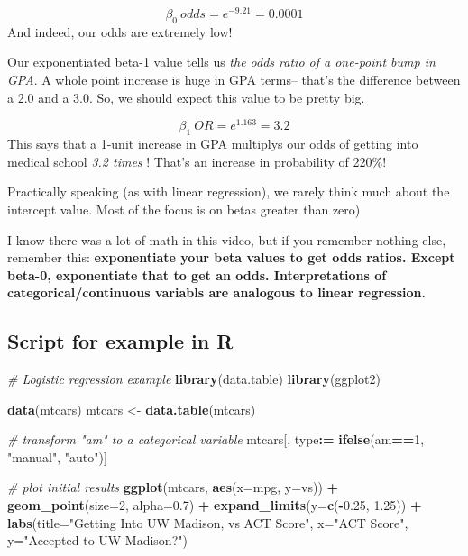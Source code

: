 \documentclass[]{article}
\newenvironment{Shaded}{\begin{snugshade}}{\end{snugshade}}
\newcommand{\KeywordTok}[1]{\textcolor[rgb]{0.13,0.29,0.53}{\textbf{#1}}}
\newcommand{\DataTypeTok}[1]{\textcolor[rgb]{0.13,0.29,0.53}{#1}}
\newcommand{\DecValTok}[1]{\textcolor[rgb]{0.00,0.00,0.81}{#1}}
\newcommand{\FloatTok}[1]{\textcolor[rgb]{0.00,0.00,0.81}{#1}}
\newcommand{\StringTok}[1]{\textcolor[rgb]{0.31,0.60,0.02}{#1}}
\newcommand{\CommentTok}[1]{\textcolor[rgb]{0.56,0.35,0.01}{\textit{#1}}}
\newcommand{\OperatorTok}[1]{\textcolor[rgb]{0.81,0.36,0.00}{\textbf{#1}}}
\newcommand{\ErrorTok}[1]{\textcolor[rgb]{0.64,0.00,0.00}{\textbf{#1}}}
\newcommand{\NormalTok}[1]{#1}
\begin{document}
\[ \beta_0 \ odds = e^{-9.21} = 0.0001 \] And indeed, our odds are
extremely low!

Our exponentiated beta-1 value tells us \emph{the odds ratio of a
one-point bump in GPA}. A whole point increase is huge in GPA terms--
that's the difference between a 2.0 and a 3.0. So, we should expect this
value to be pretty big.

\[ \beta_1 \ OR = e^{1.163} = 3.2 \] This says that a 1-unit increase in
GPA multiplys our odds of getting into medical school \emph{3.2 times} !
That's an increase in probability of 220\%!

Practically speaking (as with linear regression), we rarely think much
about the intercept value. Most of the focus is on betas greater than
zero)

I know there was a lot of math in this video, but if you remember
nothing else, remember this: \textbf{exponentiate your beta values to
get odds ratios. Except beta-0, exponentiate that to get an odds.
Interpretations of categorical/continuous variabls are analogous to
linear regression. }

\subsection{Script for example in R}\label{script-for-example-in-r}

\begin{Shaded}
\begin{Highlighting}[]
\CommentTok{# Logistic regression example}
\KeywordTok{library}\NormalTok{(data.table)}
\KeywordTok{library}\NormalTok{(ggplot2)}

\KeywordTok{data}\NormalTok{(mtcars)}
\NormalTok{mtcars <-}\StringTok{ }\KeywordTok{data.table}\NormalTok{(mtcars)}

\CommentTok{# transform "am" to a categorical variable}
\NormalTok{mtcars[, type}\OperatorTok{:}\ErrorTok{=}\StringTok{ }\KeywordTok{ifelse}\NormalTok{(am}\OperatorTok{==}\DecValTok{1}\NormalTok{, }\StringTok{"manual"}\NormalTok{, }\StringTok{"auto"}\NormalTok{)]}

\CommentTok{# plot initial results}
\KeywordTok{ggplot}\NormalTok{(mtcars, }\KeywordTok{aes}\NormalTok{(}\DataTypeTok{x=}\NormalTok{mpg, }\DataTypeTok{y=}\NormalTok{vs)) }\OperatorTok{+}
\StringTok{  }\KeywordTok{geom_point}\NormalTok{(}\DataTypeTok{size=}\DecValTok{2}\NormalTok{, }\DataTypeTok{alpha=}\FloatTok{0.7}\NormalTok{) }\OperatorTok{+}
\StringTok{  }\KeywordTok{expand_limits}\NormalTok{(}\DataTypeTok{y=}\KeywordTok{c}\NormalTok{(}\OperatorTok{-}\FloatTok{0.25}\NormalTok{, }\FloatTok{1.25}\NormalTok{)) }\OperatorTok{+}
\StringTok{  }\KeywordTok{labs}\NormalTok{(}\DataTypeTok{title=}\StringTok{"Getting Into UW Madison, vs ACT Score"}\NormalTok{,}
       \DataTypeTok{x=}\StringTok{"ACT Score"}\NormalTok{,}
       \DataTypeTok{y=}\StringTok{"Accepted to UW Madison?"}\NormalTok{)}
\end{Highlighting}
\end{Shaded}
\end{document}
